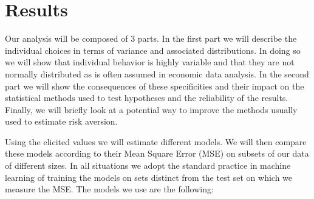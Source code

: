 \documentclass[
]{book}
\begin{document}
\hypertarget{result4}{%
\section{Results}\label{result4}}

Our analysis will be composed of 3 parts.
In the first part we will describe the individual choices in terms of variance
and associated distributions.
In doing so we will show that individual behavior is highly variable and that
they are not normally distributed as is often assumed in economic data analysis.
In the second part we will show the consequences of these specificities
and their impact on the statistical methods used to test hypotheses and
the reliability of the results. Finally, we will briefly look at a
potential way to improve the methods usually used to estimate risk
aversion.

Using the elicited values we will estimate different models.
We will then compare these models according to their Mean Square Error (MSE) on
subsets of our data of different sizes.
In all situations we adopt the standard practice in machine learning of training
the models on sets distinct from the test set on which we measure the MSE.
The models we use are the following:
\end{document}
